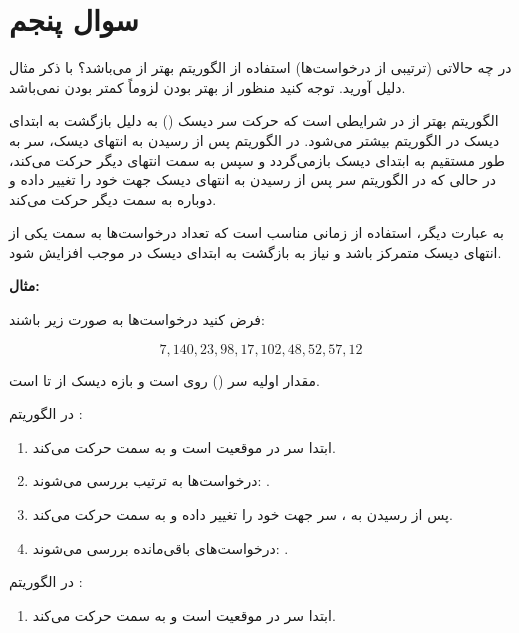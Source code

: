 \section{سوال پنجم}

در چه حالاتی (ترتیبی از درخواست‌ها) استفاده از الگوریتم  بهتر از  می‌باشد؟ با ذکر مثال دلیل آورید. توجه کنید منظور از بهتر بودن لزوماً کمتر بودن  نمی‌باشد.


\begin{qsolve}
	
	الگوریتم  بهتر از  در شرایطی است که حرکت سر دیسک () به دلیل بازگشت به ابتدای دیسک در الگوریتم  بیشتر می‌شود. در الگوریتم  پس از رسیدن به انتهای دیسک، سر به طور مستقیم به ابتدای دیسک بازمی‌گردد و سپس به سمت انتهای دیگر حرکت می‌کند، در حالی که در الگوریتم  سر پس از رسیدن به انتهای دیسک جهت خود را تغییر داده و دوباره به سمت دیگر حرکت می‌کند.
	
	به عبارت دیگر، استفاده از  زمانی مناسب است که تعداد درخواست‌ها به سمت یکی از انتهای دیسک متمرکز باشد و نیاز به بازگشت به ابتدای دیسک در  موجب افزایش  شود.
	
	\textbf{مثال:}
	
	فرض کنید درخواست‌ها به صورت زیر باشند:
	
	$$ 7, 140, 23, 98, 17, 102, 48, 52, 57, 12 $$
	
	مقدار اولیه سر () روی  است و بازه دیسک از  تا  است.
	
	در الگوریتم :
	\begin{enumerate}
		\item 
		ابتدا سر در موقعیت  است و به سمت  حرکت می‌کند.
		
		\item 
		درخواست‌ها به ترتیب بررسی می‌شوند: .
		
		\item 
		پس از رسیدن به ، سر جهت خود را تغییر داده و به سمت  حرکت می‌کند.
		
		\item 
		درخواست‌های باقی‌مانده بررسی می‌شوند: .
	\end{enumerate}
	
	در الگوریتم :
	\begin{enumerate}
		\item 
		ابتدا سر در موقعیت  است و به سمت  حرکت می‌کند.
		

\end{enumerate}
\end{qsolve}
